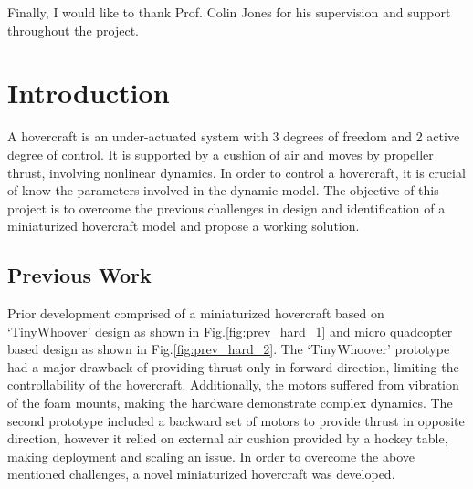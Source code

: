 \documentclass[12pt,titlepage]{article}
\begin{document}
Finally, I would like to thank Prof. Colin Jones for his supervision and support throughout the project.

\newpage

\section{Introduction}
A hovercraft is an under-actuated system with 3 degrees of freedom and 2 active degree of control. It is supported by a cushion of air and moves by propeller thrust, involving nonlinear dynamics. 
In order to control a hovercraft, it is crucial of know the parameters involved in the dynamic model. The objective of this project is to overcome the previous challenges in design and identification of a miniaturized hovercraft model and propose a working solution. 
\subsection{Previous Work}
Prior development comprised of a miniaturized hovercraft based on `TinyWhoover' design as shown in Fig.\ref{fig:prev_hard_1} \cite{b2} and micro quadcopter based design as shown in Fig.\ref{fig:prev_hard_2}. The `TinyWhoover' prototype had a major drawback of providing thrust only in forward direction, limiting the controllability of the hovercraft. Additionally, the motors suffered from vibration of the foam mounts, making the hardware demonstrate complex dynamics. The second prototype included a backward set of motors to provide thrust in opposite direction, however it relied on external air cushion provided by a hockey table, making deployment and scaling an issue. In order to overcome the above mentioned challenges, a novel miniaturized hovercraft was developed. 
\end{document}
